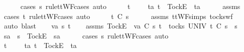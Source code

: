 \ \ \ \ \isamarkupfalse%
\ {\isacharparenleft}cases\ s{}{\isacharprime}\ rule{\isacharcolon}ttWF{\isachardot}cases{\isacharcomma}\ auto{\isacharparenright}\isanewline
\ \ \isamarkupfalse%
\ \isamarkupfalse%
\ {\isachardoublequoteopen}t\ {\isacharequal}\ {\isacharbrackleft}{\isacharbrackright}\ {\isasymor}\ {\isacharparenleft}{\isasymexists}\ ta{\isachardot}\ t\ {\isacharequal}\ {\isacharbrackleft}Tock{\isacharbrackright}\isactrlsub E\ {\isacharhash}\ ta{\isacharparenright}{\isachardoublequoteclose}\isanewline
\ \ \ \ \isamarkupfalse%
\ assms{\isacharparenleft}{}{\isacharparenright}\ \isamarkupfalse%
\ {\isacharparenleft}cases\ t\ rule{\isacharcolon}ttWF{\isachardot}cases{\isacharcomma}\ auto{\isacharparenright}\isanewline
\ \ \isamarkupfalse%
\ \isamarkupfalse%
\ {\isachardoublequoteopen}t\ {\isasymle}\isactrlsub C\ s{}{\isacharprime}{\isachardoublequoteclose}\isanewline
\ \ \ \ \isamarkupfalse%
\ assms{\isacharparenleft}{}{\isacharparenright}\ ttWF{\isachardot}simps{\isacharparenleft}{}{\isacharparenright}\ tocks{\isacharunderscore}wf\ \isamarkupfalse%
\ {\isacharparenleft}auto{\isacharcomma}\ blast{\isacharparenright}\isanewline
{}\isamarkupfalse%
\isanewline
\ \ \isamarkupfalse%
\ va\ s{}{\isacharprime}\ t\isanewline
\ \ \isamarkupfalse%
\ assms{\isacharcolon}\ {\isachardoublequoteopen}{\isacharbrackleft}Tock{\isacharbrackright}\isactrlsub E\ {\isacharhash}\ va\ {\isasymsubseteq}\isactrlsub C\ s{}{\isacharprime}{\isachardoublequoteclose}\ {\isachardoublequoteopen}t\ {\isasymin}\ tocks\ UNIV{\isachardoublequoteclose}\ {\isachardoublequoteopen}t\ {\isasymle}\isactrlsub C\ s{}{\isacharprime}\ {\isacharat}\ s{}{\isachardoublequoteclose}\isanewline
\ \ \isamarkupfalse%
\ \isamarkupfalse%
\ s{}{\isacharprime}a\ \ {\isachardoublequoteopen}s{}{\isacharprime}\ {\isacharequal}\ {\isacharbrackleft}Tock{\isacharbrackright}\isactrlsub E\ {\isacharhash}\ s{}{\isacharprime}a{\isachardoublequoteclose}\isanewline
\ \ \ \ \isamarkupfalse%
\ {\isacharparenleft}cases\ s{}{\isacharprime}\ rule{\isacharcolon}ttWF{\isachardot}cases{\isacharcomma}\ auto{\isacharparenright}\isanewline
\ \ \isamarkupfalse%
\ \isamarkupfalse%
\ {\isachardoublequoteopen}t\ {\isacharequal}\ {\isacharbrackleft}{\isacharbrackright}\ {\isasymor}\ {\isacharparenleft}{\isasymexists}\ ta{\isachardot}\ t\ {\isacharequal}\ {\isacharbrackleft}Tock{\isacharbrackright}\isactrlsub E\ {\isacharhash}\ ta{\isacharparenright}{\isachardoublequoteclose}\isanewline
